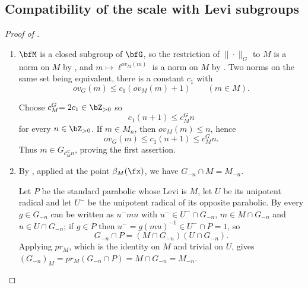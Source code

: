 \documentclass[12pt,a4paper]{amsart}%
\newcommand{\RamiA}[1]{{{#1}}}
\newcommand{\RamiC}[1]{{{#1}}}
\begin{document}
\subsection{\RamiA{\RamiC{Compatibility}  of the scale with Levi subgroups}}\label{ssec:cGM}
\begin{proof}[Proof of ]
$ $
\begin{enumerate}
    \item
$\bfM$ is a closed subgroup of $\bfG$, so the restriction of $\|\cdot\|_G$ to $M$ is a norm on
$M$ by , and $m\mapsto\ell^{ov_M(m)}$ is a norm on $M$ by
. Two norms on the same set being equivalent, there is a constant $c_1$ with
$$
ov_G(m)\leq c_1(ov_M(m)+1)\qquad (m\in M).
$$

Choose $c^G_M\RamiC{=2c_1}\in \Z_{>0}$ \RamiC{so}
$$
c_1(n+1)\leq c^G_M n
$$
for every $n\in \Z_{>0}$. If $m\in M_n$, then $ov_M(m)\leq n$, hence
$$
ov_G(m)\leq c_1(n+1)\leq c^G_M n.
$$
Thus $m\in G_{c^G_M n}$, proving the first assertion.
\item By \cite[Proposition 13.2.5(6)]{KP}, applied at the point $\beta_M(\fx)$, we have
$G_{-n}\cap M=M_{-n}$. 

\RamiA{Let $P$ be the standard parabolic whose Levi is $M$, let $U$ be its unipotent radical and let $U^{-}$ be the unipotent radical of its opposite parabolic.}
By  every $g\in G_{-n}$ \RamiC{can be written as} $u^-mu$ with
$u^-\in U^-\cap G_{-n}$, $m\in M\cap G_{-n}$ and $u\in U\cap G_{-n}$; if $g\in P$ then
$u^-=g(mu)^{-1}\in U^-\cap P=1$, so
$$
G_{-n}\cap P=(M\cap G_{-n})(U\cap G_{-n}).
$$
Applying $pr_M$, which is the identity on $M$ and trivial on $U$, gives
$(G_{-n})_M\RamiC{=pr_M(G_{-n} \cap P)}=M\cap G_{-n}=M_{-n}$.
\end{enumerate}
\end{proof}
\end{document}
